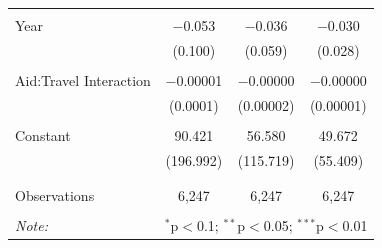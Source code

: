 \documentclass[12pt, letterpaper]{article}
\begin{document}
\begin{table}[!htbp]
\begin{tabular}{@{\extracolsep{5pt}}lccc}
	& & & \\ 
	Year & $-$0.053 & $-$0.036 & $-$0.030 \\ 
	& (0.100) & (0.059) & (0.028) \\ 
	& & & \\ 
	Aid:Travel Interaction & $-$0.00001 & $-$0.00000 & $-$0.00000 \\ 
	& (0.0001) & (0.00002) & (0.00001) \\ 
	& & & \\ 
	Constant & 90.421 & 56.580 & 49.672 \\ 
	& (196.992) & (115.719) & (55.409) \\ 
	& & & \\ 
	\hline \\[-1.8ex] 
	Observations & 6,247 & 6,247 & 6,247 \\ 
	\hline 
	\hline \\[-1.8ex] 
	\textit{Note:}  & \multicolumn{3}{r}{$^{*}$p$<$0.1; $^{**}$p$<$0.05; $^{***}$p$<$0.01} \\  
	\end{tabular} 
	\label{yearly2015nopop}
\end{table}
\end{document}
